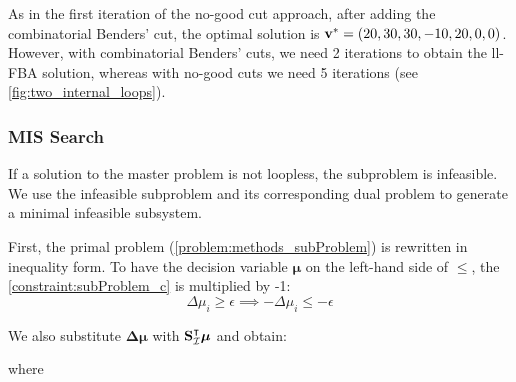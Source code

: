 As in the first iteration of the no-good cut approach, after adding the combinatorial Benders' cut, the optimal solution is $\bold v^* = (20, 30, 30, -10, 20, 0, 0)$. However, with combinatorial Benders' cuts, we need 2 iterations to obtain the \textsf{ll-FBA} solution, whereas with no-good cuts we need 5 iterations (see \cref{fig:two_internal_loops}).

\subsubsection*{MIS Search} \label{section:methods_mis} 
If a solution to the master problem is not loopless, the subproblem is infeasible.
We use the infeasible subproblem and its corresponding dual problem to generate a minimal infeasible subsystem. 

\newpage
First, the primal problem (\cref{problem:methods_subProblem}) is rewritten in inequality form.
To have the decision variable $\boldsymbol \mu$ on the left-hand side of $\leq$, the \cref{constraint:subProblem_c} is multiplied by -1:
\begin{equation*}
    \Delta \mu_i \geq \epsilon \implies - \Delta \mu_i \leq -\epsilon
\end{equation*}

We also substitute $\boldsymbol{\Delta \mu}$ with $\bold S_{\mathcal{I}}^\intercal \boldsymbol \mu$
and obtain:
\quad where %

